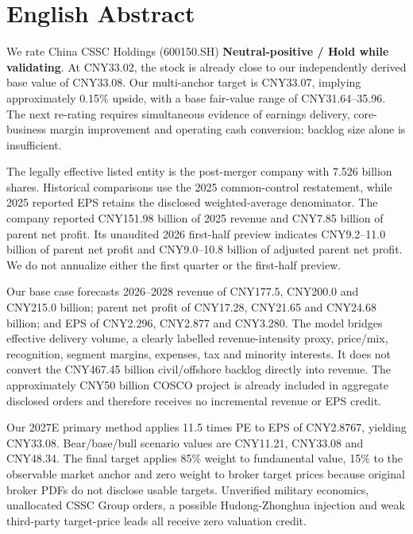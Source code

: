 \chapter*{English Abstract}

\begin{houseviewbox}
We rate China CSSC Holdings (600150.SH) \textbf{Neutral-positive / Hold while validating}. At CNY33.02, the stock is already close to our independently derived base value of CNY33.08. Our multi-anchor target is CNY33.07, implying approximately 0.15\% upside, with a base fair-value range of CNY31.64--35.96. The next re-rating requires simultaneous evidence of earnings delivery, core-business margin improvement and operating cash conversion; backlog size alone is insufficient.
\end{houseviewbox}

The legally effective listed entity is the post-merger company with 7.526 billion shares. Historical comparisons use the 2025 common-control restatement, while 2025 reported EPS retains the disclosed weighted-average denominator. The company reported CNY151.98 billion of 2025 revenue and CNY7.85 billion of parent net profit. Its unaudited 2026 first-half preview indicates CNY9.2--11.0 billion of parent net profit and CNY9.0--10.8 billion of adjusted parent net profit. We do not annualize either the first quarter or the first-half preview.

Our base case forecasts 2026--2028 revenue of CNY177.5, CNY200.0 and CNY215.0 billion; parent net profit of CNY17.28, CNY21.65 and CNY24.68 billion; and EPS of CNY2.296, CNY2.877 and CNY3.280. The model bridges effective delivery volume, a clearly labelled revenue-intensity proxy, price/mix, recognition, segment margins, expenses, tax and minority interests. It does not convert the CNY467.45 billion civil/offshore backlog directly into revenue. The approximately CNY50 billion COSCO project is already included in aggregate disclosed orders and therefore receives no incremental revenue or EPS credit.

Our 2027E primary method applies 11.5 times PE to EPS of CNY2.8767, yielding CNY33.08. Bear/base/bull scenario values are CNY11.21, CNY33.08 and CNY48.34. The final target applies 85\% weight to fundamental value, 15\% to the observable market anchor and zero weight to broker target prices because original broker PDFs do not disclose usable targets. Unverified military economics, unallocated CSSC Group orders, a possible Hudong-Zhonghua injection and weak third-party target-price leads all receive zero valuation credit.

